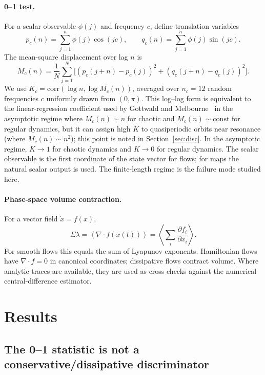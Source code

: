 \documentclass[aip,cha,preprint,amsmath,amssymb,floatfix]{revtex4-2}
\begin{document}
\paragraph{0--1 test.}
For a scalar observable $\phi(j)$ and frequency $c$, define translation variables
\begin{equation}
p_c(n)=\sum_{j=1}^{n}\phi(j)\cos(jc),\qquad
q_c(n)=\sum_{j=1}^{n}\phi(j)\sin(jc).
\end{equation}
The mean-square displacement over lag $n$ is
\begin{equation}
M_c(n)=\frac{1}{N}\sum_{j=1}^{N}\bigl[(p_c(j+n)-p_c(j))^2+(q_c(j+n)-q_c(j))^2\bigr].
\label{eq:Mc_def}
\end{equation}
We use $K_c=\mathrm{corr}(\log n,\log M_c(n))$, averaged over $n_c=12$ random
frequencies $c$ uniformly drawn from $(0,\pi)$.  This log--log form is equivalent
to the linear-regression coefficient used by Gottwald and Melbourne~\cite{gottwald2009}
in the asymptotic regime where $M_c(n)\sim n$ for chaotic and $M_c(n)\sim\mathrm{const}$
for regular dynamics, but it can assign high $K$ to quasiperiodic orbits near resonance
(where $M_c(n)\sim n^2$); this point is noted in Section~\ref{sec:disc}.
In the asymptotic regime, $K\to1$ for chaotic dynamics and $K\to0$ for regular
dynamics. The scalar observable is the first coordinate of the state vector for
flows; for maps the natural scalar output is used. The finite-length regime is the
failure mode studied here.

\paragraph{Phase-space volume contraction.}
For a vector field $\dot{x}=f(x)$,
\begin{equation}
\Sigma\lambda = \left\langle \nabla\!\cdot f(x(t))\right\rangle
=\left\langle\sum_i \frac{\partial f_i}{\partial x_i}\right\rangle.
\end{equation}
For smooth flows this equals the sum of Lyapunov exponents. Hamiltonian flows have
$\nabla\!\cdot f=0$ in canonical coordinates; dissipative flows contract volume.
Where analytic traces are available, they are used as cross-checks against the
numerical central-difference estimator.

\section{Results}

\subsection{The 0--1 statistic is not a conservative/dissipative discriminator}
\end{document}

